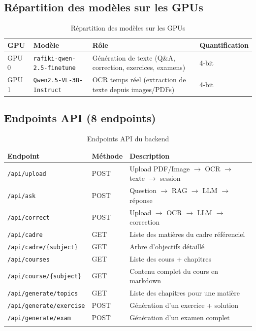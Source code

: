 \documentclass[12pt,a4paper]{report}
\begin{document}
\subsection{Répartition des modèles sur les GPUs}

\begin{table}[h!]
    \centering
    \begin{tabular}{p{2cm} p{4.5cm} p{4.5cm} p{3cm}}
        \toprule
        \textbf{GPU} & \textbf{Modèle} & \textbf{Rôle} & \textbf{Quantification} \\
        \midrule
        GPU 0 & \texttt{rafiki-qwen-2.5-finetune} & Génération de texte (Q\&A, correction, exercices, examens) & 4-bit \\
        GPU 1 & \texttt{Qwen2.5-VL-3B-Instruct} & OCR temps réel (extraction de texte depuis images/PDFs) & 4-bit \\
        \bottomrule
    \end{tabular}
    \caption{Répartition des modèles sur les GPUs}
\end{table}

\subsection{Endpoints API (8 endpoints)}

\begin{longtable}{p{4cm} p{3cm} p{7cm}}
    \toprule
    \textbf{Endpoint} & \textbf{Méthode} & \textbf{Description} \\
    \midrule
    \endhead
    \texttt{/api/upload} & POST & Upload PDF/Image $\rightarrow$ OCR $\rightarrow$ texte $\rightarrow$ session \\
    \texttt{/api/ask} & POST & Question $\rightarrow$ RAG $\rightarrow$ LLM $\rightarrow$ réponse \\
    \texttt{/api/correct} & POST & Upload $\rightarrow$ OCR $\rightarrow$ LLM $\rightarrow$ correction \\
    \texttt{/api/cadre} & GET & Liste des matières du cadre référenciel \\
    \texttt{/api/cadre/\{subject\}} & GET & Arbre d'objectifs détaillé \\
    \texttt{/api/courses} & GET & Liste des cours + chapitres \\
    \texttt{/api/course/\{subject\}} & GET & Contenu complet du cours en markdown \\
    \texttt{/api/generate/topics} & GET & Liste des chapitres pour une matière \\
    \texttt{/api/generate/exercise} & POST & Génération d'un exercice + solution \\
    \texttt{/api/generate/exam} & POST & Génération d'un examen complet \\
    \bottomrule
    \caption{Endpoints API du backend}
\end{longtable}
\end{document}
